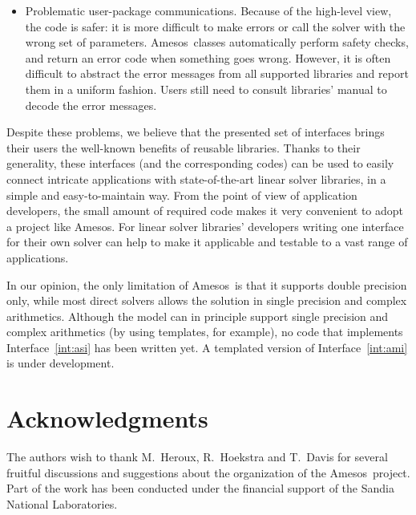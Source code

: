 \documentclass[acmtocl]{acmtrans2m}
\newcommand{\amesos}{{\sc Amesos}}
\begin{document}
\begin{itemize}
\item
Problematic user-package communications. Because of the high-level view, the
code is safer: it is more difficult to make errors or call the solver with the
wrong set of parameters. \amesos\ classes automatically perform safety checks,
      and return an error code when something goes wrong. However,
it is often difficult to abstract the error
messages from all supported libraries and report them in a uniform fashion.
Users still need to consult libraries' manual to decode the error messages.
\end{itemize}

%

Despite these problems, we believe that the presented set of interfaces
brings their users the well-known benefits of reusable libraries. Thanks to
their generality, these interfaces (and the corresponding codes) can be used to
easily connect intricate applications with state-of-the-art linear solver
libraries, in a simple and easy-to-maintain way. From the point of view of
application developers, the small amount of required code makes it very
convenient to adopt a project like \amesos. For linear solver
libraries' developers  writing one interface for their own solver can help to make it
applicable and testable to a vast range of applications.

In our opinion, the only limitation of \amesos\ is that it supports double
precision only, while most direct solvers allows the solution in single
precision and complex arithmetics.  Although the model can in principle
support single precision and complex arithmetics (by using templates, for
                                                  example), no code that
implements Interface~\ref{int:asi} has been written yet. A templated version
of Interface~\ref{int:ami} is under development.

\section*{Acknowledgments}

The authors wish to thank M.~Heroux, R.~Hoekstra and T.~Davis for several
fruitful discussions and suggestions about the organization of the \amesos\
project. Part of the work has been conducted under the financial support of
the Sandia National Laboratories.



\end{document}
